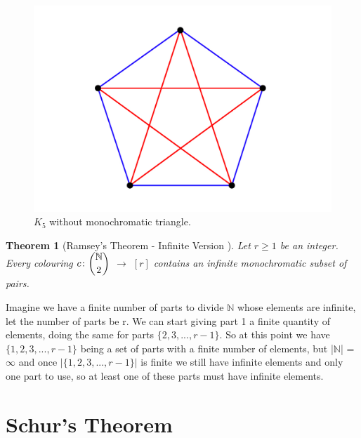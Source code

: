 \documentclass[12pt,twoside,a4paper,bibliography=totocnumbered]{book}
\numberwithin{equation}{section}
\newtheorem{theorem}             {Theorem}[section]
\theoremstyle{remark}
\begin{document}
\begin{figure}[H]
     \centering
     \includegraphics[scale=1]{Figuras/K5-sem-triangulo.jpg}
     \caption{$K_5$ without monochromatic triangle.}
     \label{fig:K5}
\end{figure}

\begin{theorem}[{Ramsey's Theorem - Infinite Version \cite{Ra29}}]\label{thm:RamseyTheorem}
Let $r \geq 1$ be an integer. Every colouring $c\colon \dbinom{\mathbb{N}}{2}$ $\rightarrow$ $[r]$ contains an infinite monochromatic subset of pairs.
\end{theorem}

Imagine we have a finite number of parts to divide $\mathbb{N}$ whose elements are infinite, let the number of parts be r. We can start giving part 1 a finite quantity of elements, doing the same for parts $\{2, 3,..., r-1\}$. So at this point we have $\{1,2,3,...,r-1\}$ being a set of parts with a finite number of elements, but |$\mathbb{N}$| = $\infty$ and once $|\{1, 2, 3,..., r-1\}|$ is finite we still have infinite elements and only one part to use, so at least one of these parts must have infinite elements.

\section{Schur's Theorem}
\end{document}
